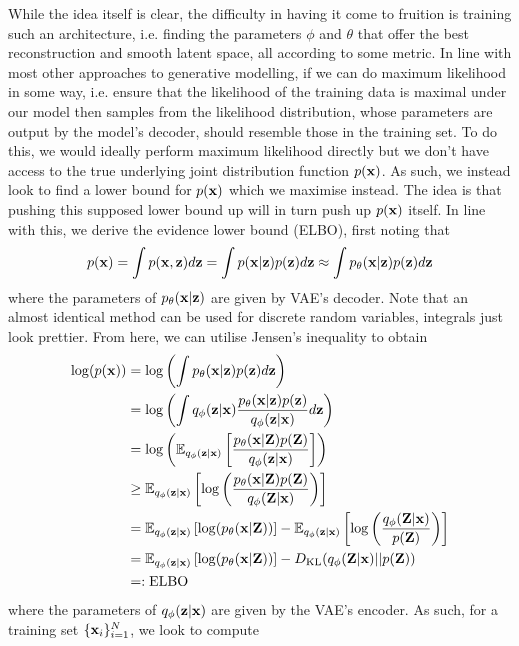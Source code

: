 \documentclass[11pt]{article}
\begin{document}
While the idea itself is clear, the difficulty in having it come to fruition is training such an architecture, i.e. finding the parameters $\phi$ and $\theta$ that offer the best reconstruction and smooth latent space, all according to some metric. In line with most other approaches to generative modelling, if we can do maximum likelihood in some way, i.e. ensure that the likelihood of the training data is maximal under our model then samples from the likelihood distribution, whose parameters are output by the model's decoder, should resemble those in the training set. To do this, we would ideally perform maximum likelihood directly but we don't have access to the true underlying joint distribution function $p(\mathbf{x})$. As such, we instead look to find a lower bound for $p(\mathbf{x})$ which we maximise instead. The idea is that pushing this supposed lower bound up will in turn push up $p(\mathbf{x})$ itself. In line with this, we derive the evidence lower bound (ELBO), first noting that
$$
p(\mathbf{x})
=
\int p(\mathbf{x},\mathbf{z})d\mathbf{z}
=
\int p(\mathbf{x}|\mathbf{z})p(\mathbf{z})d\mathbf{z}
\approx
\int p_{\theta}(\mathbf{x}|\mathbf{z})p(\mathbf{z})d\mathbf{z}
$$
where the parameters of $p_{\theta}(\mathbf{x}|\mathbf{z})$ are given by VAE's decoder. Note that an almost identical method can be used for discrete random variables, integrals just look prettier. From here, we can utilise Jensen's inequality to obtain
\begin{align*}
    \log(p(\mathbf{x}))
    &=
    \log\left(\int p_{\theta}(\mathbf{x}|\mathbf{z})p(\mathbf{z})d\mathbf{z}\right)\\
    &=
    \log\left(\int q_{\phi}(\mathbf{z}|\mathbf{x})\frac{p_{\theta}(\mathbf{x}|\mathbf{z})p(\mathbf{z})}{q_{\phi}(\mathbf{z}|\mathbf{x})}d\mathbf{z}\right)\\
    &=
    \log\left(\mathbb{E}_{q_{\phi}(\mathbf{z}|\mathbf{x})}\left[\frac{p_{\theta}(\mathbf{x}|\mathbf{Z})p(\mathbf{Z})}{q_{\phi}(\mathbf{z}|\mathbf{x})}\right]\right)\\
    &\geq
    \mathbb{E}_{q_{\phi}(\mathbf{z}|\mathbf{x})}\left[\log\left(\frac{p_{\theta}(\mathbf{x}|\mathbf{Z})p(\mathbf{Z})}{q_{\phi}(\mathbf{Z}|\mathbf{x})}\right)\right]\\
    &=
    \mathbb{E}_{q_{\phi}(\mathbf{z}|\mathbf{x})}\left[\log(p_{\theta}(\mathbf{x}|\mathbf{Z}))\right]-\mathbb{E}_{q_{\phi}(\mathbf{z}|\mathbf{x})}\left[\log\left(\frac{q_{\phi}(\mathbf{Z}|\mathbf{x})}{p(\mathbf{Z})}\right)\right]\\
    &=
    \mathbb{E}_{q_{\phi}(\mathbf{z}|\mathbf{x})}\left[\log(p_{\theta}(\mathbf{x}|\mathbf{Z}))\right]-D_{\text{KL}}(q_{\phi}(\mathbf{Z}|\mathbf{x})||p(\mathbf{Z}))\\
    &=:
    \text{ELBO}
\end{align*}
where the parameters of $q_{\phi}(\mathbf{z}|\mathbf{x})$ are given by the VAE's encoder. As such, for a training set $\{\mathbf{x}_i\}_{i=1}^N$, we look to compute
\end{document}
